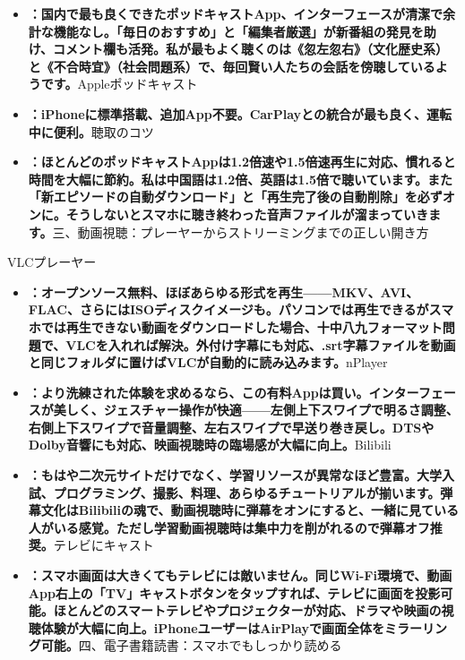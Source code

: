\begin{itemize}
  \item \textbf{：国内で最も良くできたポッドキャストApp、インターフェースが清潔で余計な機能なし。「毎日のおすすめ」と「編集者厳選」が新番組の発見を助け、コメント欄も活発。私が最もよく聴くのは《忽左忽右》（文化歴史系）と《不合時宜》（社会問題系）で、毎回賢い人たちの会話を傍聴しているようです。}Appleポッドキャスト
  \item \textbf{：iPhoneに標準搭載、追加App不要。CarPlayとの統合が最も良く、運転中に便利。}聴取のコツ
  \item \textbf{：ほとんどのポッドキャストAppは1.2倍速や1.5倍速再生に対応、慣れると時間を大幅に節約。私は中国語は1.2倍、英語は1.5倍で聴いています。また「新エピソードの自動ダウンロード」と「再生完了後の自動削除」を必ずオンに。そうしないとスマホに聴き終わった音声ファイルが溜まっていきます。}三、動画視聴：プレーヤーからストリーミングまでの正しい開き方
\end{itemize}


VLCプレーヤー

\begin{itemize}
  \item \textbf{：オープンソース無料、ほぼあらゆる形式を再生——MKV、AVI、FLAC、さらにはISOディスクイメージも。パソコンでは再生できるがスマホでは再生できない動画をダウンロードした場合、十中八九フォーマット問題で、VLCを入れれば解決。外付け字幕にも対応、.srt字幕ファイルを動画と同じフォルダに置けばVLCが自動的に読み込みます。}nPlayer
  \item \textbf{：より洗練された体験を求めるなら、この有料Appは買い。インターフェースが美しく、ジェスチャー操作が快適——左側上下スワイプで明るさ調整、右側上下スワイプで音量調整、左右スワイプで早送り巻き戻し。DTSやDolby音響にも対応、映画視聴時の臨場感が大幅に向上。}Bilibili
  \item \textbf{：もはや二次元サイトだけでなく、学習リソースが異常なほど豊富。大学入試、プログラミング、撮影、料理、あらゆるチュートリアルが揃います。弾幕文化はBilibiliの魂で、動画視聴時に弾幕をオンにすると、一緒に見ている人がいる感覚。ただし学習動画視聴時は集中力を削がれるので弾幕オフ推奨。}テレビにキャスト
  \item \textbf{：スマホ画面は大きくてもテレビには敵いません。同じWi-Fi環境で、動画App右上の「TV」キャストボタンをタップすれば、テレビに画面を投影可能。ほとんどのスマートテレビやプロジェクターが対応、ドラマや映画の視聴体験が大幅に向上。iPhoneユーザーはAirPlayで画面全体をミラーリング可能。}四、電子書籍読書：スマホでもしっかり読める
\end{itemize}


